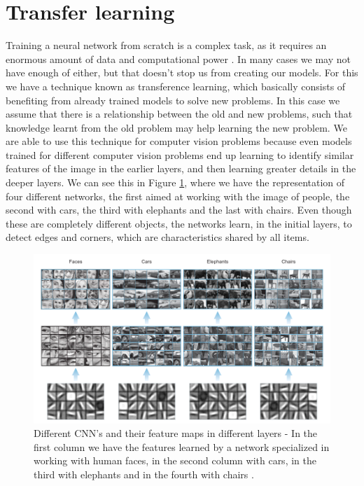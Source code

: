 \section{Transfer learning} \label{transferlearning}
Training a neural network from scratch is a complex task, as it requires an enormous amount of data and computational power \cite{elgendy2020}. In many cases we may not have enough of either, but that doesn't stop us from creating our models. For this we have a technique known as transference learning, which basically consists of benefiting from already trained models to solve new problems. In this case we assume that there is a relationship between the old and new problems, such that knowledge learnt from the old problem may help learning the new problem. 
We are able to use this technique for computer vision problems because even models trained for different computer vision problems end up learning to identify similar features of the image in the earlier layers, and then learning greater details in the deeper layers. We can see this in Figure \ref{fig:figure139}, where we have the representation of four different networks, the first aimed at working with the image of people, the second with cars, the third with elephants and the last with chairs. Even though these are completely different objects, the networks learn, in the initial layers, to detect edges and corners, which are characteristics shared by all items.

\begin{figure}
    \centering
    \includegraphics[width=\textwidth]{"Part 3 - Learning Systems/Supervised Learning/Deep Learning/images/figure139.png"}
    \caption{Different CNN's and their feature maps in different layers - In the first column we have the features learned by a network specialized in working with human faces, in the second column with cars, in the third with elephants and in the fourth with chairs \cite{elgendy2020}.}
    \label{fig:figure139}
\end{figure}

